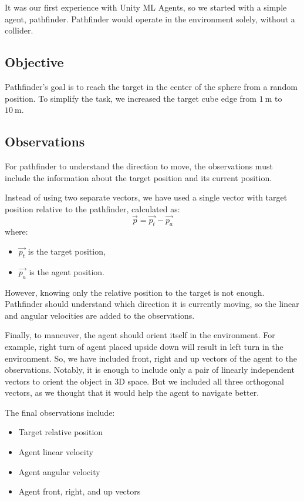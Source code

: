 
It was our first experience with Unity ML Agents, so we started with a simple agent, pathfinder.
Pathfinder would operate in the environment solely, without a collider.

\subsection{Objective}\label{subsec:pathfindr_objective}
Pathfinder's goal is to reach the target in the center of the sphere from a random position.
To simplify the task, we increased the target cube edge from $\SI{1}{\metre}$ to $\SI{10}{\metre}$.

\subsection{Observations}\label{subsec:pathfinder_observations}
For pathfinder to understand the direction to move,
the observations must include the information about the target position and its current position.

Instead of using two separate vectors, we have used a single vector with target position relative to the pathfinder,
calculated as:
\[
	\vec{p} = \vec{p_t} - \vec{p_a}
\] where:
\begin{itemize}
	\item $\vec{p_t}$ is the target position,
	\item $\vec{p_a}$ is the agent position.
\end{itemize}

However, knowing only the relative position to the target is not enough.
Pathfinder should understand which direction it is currently moving,
so the linear and angular velocities are added to the observations.

Finally, to maneuver, the agent should orient itself in the environment.
For example, right turn of agent placed upside down will result in left turn in the environment.
So, we have included front, right and up vectors of the agent to the observations.
Notably, it is enough to include only a pair of linearly independent vectors to orient the object in 3D space.
But we included all three orthogonal vectors, as we thought that it would help the agent to navigate better.

The final observations include:
\begin{itemize}
	\item Target relative position
	\item Agent linear velocity
	\item Agent angular velocity
	\item Agent front, right, and up vectors
\end{itemize}


